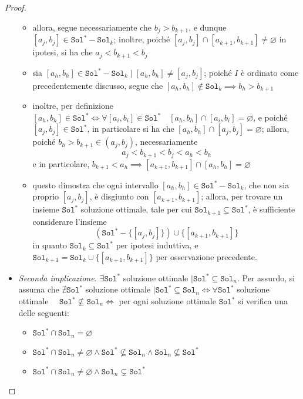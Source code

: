 \documentclass[a4paper, 12pt]{report}
\begin{document}
\begin{proof}
\begin{itemize}
\begin{itemize}
                    \item allora, segue necessariamente che $b_j > b_{k + 1}$, e dunque $[a_j, b_j] \in \texttt{Sol}^* - \texttt{Sol}_k$; inoltre, poiché $[a_j, b_j] \cap [a_{k +1} , b_{k +1}] \neq \varnothing$ in ipotesi, si ha che $a_j < b_{k +1} < b_j$
                    \item sia $[a_h, b_h] \in \texttt{Sol}^* - \texttt{Sol}_k \mid [a_h, b_h] \neq [a_j, b_j]$; poiché $I$ è ordinato come precedentemente discusso, segue che $[a_h, b_h] \notin \texttt{Sol}_k \implies b_h > b_{k +1}$
                    \item inoltre, per definizione $[a_h, b_h] \in \texttt{Sol}^* \iff \forall [a_i, b_i] \in \texttt{Sol}^* \quad [a_h, b_h] \cap [a_i, b_i] = \varnothing$, e poiché $[a_j,b_j] \in \texttt{Sol}^*$, in particolare si ha che $[a_h, b_h] \cap [a_j, b_j] = \varnothing$; allora, poiché $b_h > b_{k + 1} \in (a_j, b_j)$, necessariamente $$a_j < b_{k +1} < b_j < a_h < b_h$$ e in particolare, $b_{k + 1} < a_h \implies [a_{k +1}, b_{k +1}] \cap [a_h, b_h] = \varnothing$
                    \item questo dimostra che ogni intervallo $[a_h, b_h] \in \texttt{Sol}^* - \texttt{Sol}_k$, che non sia proprio $[a_j, b_j]$, è disgiunto con $[a_{k +1}, b_{k +1}]$; allora, per trovare un insieme $\texttt{Sol}^*$ soluzione ottimale, tale per cui $\texttt{Sol}_{k + 1} \subseteq \texttt{Sol}^*$, è sufficiente considerare l'insieme $$\left(\texttt{Sol}^* - \{[a_j, b_j]\}\right) \cup \{[a_{k +1}, b_{k +1}]\}$$ in quanto $\texttt{Sol}_k \subseteq \texttt{Sol}^*$ per ipotesi induttiva, e $\texttt{Sol}_{k + 1} = \texttt{Sol}_k \cup \{[a_{k +1}, b_{k + 1}]\}$ per osservazione precedente.
                \end{itemize}
                \item[] \textit{Seconda implicazione.} $\exists \texttt{Sol}^*$ soluzione ottimale $\mid \texttt{Sol}^* \subseteq \texttt{Sol}_n$. Per assurdo, si assuma che $\nexists \texttt{Sol}^*$ soluzione ottimale $\mid \texttt{Sol}^* \subseteq \texttt{Sol}_n \iff \forall \texttt{Sol}^*$ soluzione ottimale $\quad \texttt{Sol}^* \not \subseteq \texttt{Sol}_n \iff$ per ogni soluzione ottimale $\texttt{Sol}^*$ si verifica una delle seguenti:
                \begin{itemize}
                    \item $\texttt{Sol}^* \cap \texttt{Sol}_n = \varnothing$
                    \item $\texttt{Sol}^* \cap \texttt{Sol}_n \neq \varnothing \land \texttt{Sol}^* \not \subseteq \texttt{Sol}_n \land \texttt{Sol}_n \not \subseteq \texttt{Sol}^*$
                    \item $\texttt{Sol}^* \cap \texttt{Sol}_n \neq \varnothing \land \texttt{Sol}_n \subsetneq \texttt{Sol}^*$
                \end{itemize}


\end{itemize}
\end{proof}
\end{document}
